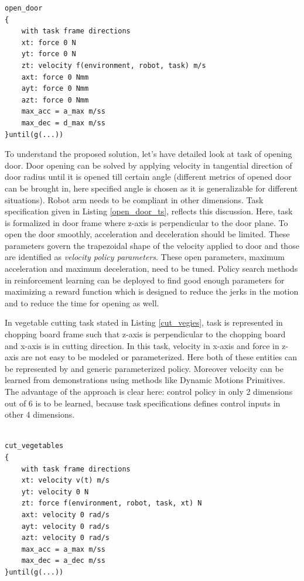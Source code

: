\documentclass[thesis]{mas_proposal}
\begin{document}
\begin{lstlisting}[label=open_door_ts,caption=Task specification for opening door]
open_door
{
	with task frame directions
	xt: force 0 N
	yt: force 0 N
	zt: velocity f(environment, robot, task) m/s
	axt: force 0 Nmm
	ayt: force 0 Nmm
	azt: force 0 Nmm
	max_acc = a_max m/ss
	max_dec = d_max m/ss
}until(g(...))

\end{lstlisting}
To understand the proposed solution, let's have detailed look at task of opening door. Door opening can be solved by applying velocity in tangential direction of door radius until it is opened till certain angle (different metrics of opened door can be brought in, here specified angle is chosen as it is generalizable for different situations). Robot arm needs to be compliant in other dimensions. Task specification given in Listing \ref{open_door_ts}, reflects this discussion. Here, task is formalized in door frame where z-axis is perpendicular to the door plane. To open the door smoothly, acceleration and deceleration should be limited. These parameters govern the trapezoidal shape of the velocity applied to door and those are identified as \textit{velocity policy parameters}. These open parameters, maximum acceleration and maximum deceleration, need to be tuned. Policy search methods in reinforcement learning can be deployed to find good enough parameters for maximizing a reward function which is designed to reduce the jerks in the motion and to reduce the time for opening as well.

In vegetable cutting task stated in Listing \ref{cut_vegies}, task is represented in chopping board frame such that z-axis is perpendicular to the chopping board and x-axis is in cutting direction. In this task, velocity in x-axis and force in z-axis are not easy to be modeled or parameterized. Here both of these entities can be represented by and generic parameterized policy. Moreover velocity can be learned from demonstrations using methods like Dynamic Motions Primitives\cite{lioutikov2016learning}. The advantage of the approach is clear here: control policy in only 2 dimensions out of 6 is to be learned, because task specifications defines control inputs in other 4 dimensions. 

\begin{lstlisting}[label=cut_vegies,caption=Task specification for cutting vegetables]

cut_vegetables
{
	with task frame directions
	xt: velocity v(t) m/s
	yt: velocity 0 N
	zt: force f(environment, robot, task, xt) N
	axt: velocity 0 rad/s
	ayt: velocity 0 rad/s
	azt: velocity 0 rad/s
	max_acc = a_max m/ss
	max_dec = a_dec m/ss
}until(g(...))

\end{lstlisting}
\end{document}
